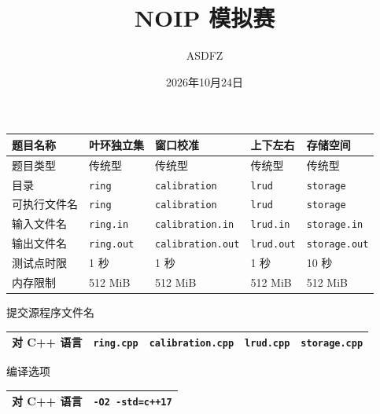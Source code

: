 \documentclass[12pt,a4paper,oneside]{ctexart}
\begin{document}
  \title{\heiti{} NOIP 模拟赛}
  \author{ASDFZ}
  \date{2026年10月24日}
  \maketitle
  \begin{center}
    \footnotesize
    \begin{tabularx}{\textwidth}{|X|X|X|X|X|}
    \hline
题目名称 & 叶环独立集 & 窗口校准 & 上下左右 & 存储空间\\
\hline
题目类型 & 传统型 & 传统型 & 传统型 & 传统型\\
\hline
目录 & \texttt{ring} & \texttt{calibration} & \texttt{lrud} & \texttt{storage}\\
\hline
可执行文件名 & \texttt{ring} & \texttt{calibration} & \texttt{lrud} & \texttt{storage}\\
\hline
输入文件名 & \texttt{ring.in} & \texttt{calibration.in} & \texttt{lrud.in} & \texttt{storage.in}\\
\hline
输出文件名 & \texttt{ring.out} & \texttt{calibration.out} & \texttt{lrud.out} & \texttt{storage.out}\\
\hline
测试点时限 & 1 秒 & 1 秒 & 1 秒 & 10 秒\\
\hline
内存限制 & 512 MiB & 512 MiB & 512 MiB & 512 MiB\\
\hline
    \end{tabularx}
  \end{center}
  \hspace{2em}提交源程序文件名
  \begin{center}
    \footnotesize
    \begin{tabularx}{\textwidth}{|p{90pt}|X<{\centering}|X<{\centering}|X<{\centering}|X<{\centering}|}
    \hline
    对 C++ 语言 & \texttt{ring.cpp} & \texttt{calibration.cpp} & \texttt{lrud.cpp} & \texttt{storage.cpp}\\
    \hline
    \end{tabularx}
  \end{center}
  \hspace{2em}编译选项
  \begin{center}
    \begin{tabularx}{\textwidth}{|p{100pt}|X<{\centering}|}
    \hline
    对 C++ 语言 & \texttt{-O2 -std=c++17} \\
    \hline
    \end{tabularx}
  \end{center}
  \vspace{.8em}
  \hspace{1em}{\heiti 注意事项与提醒：}
\end{document}
